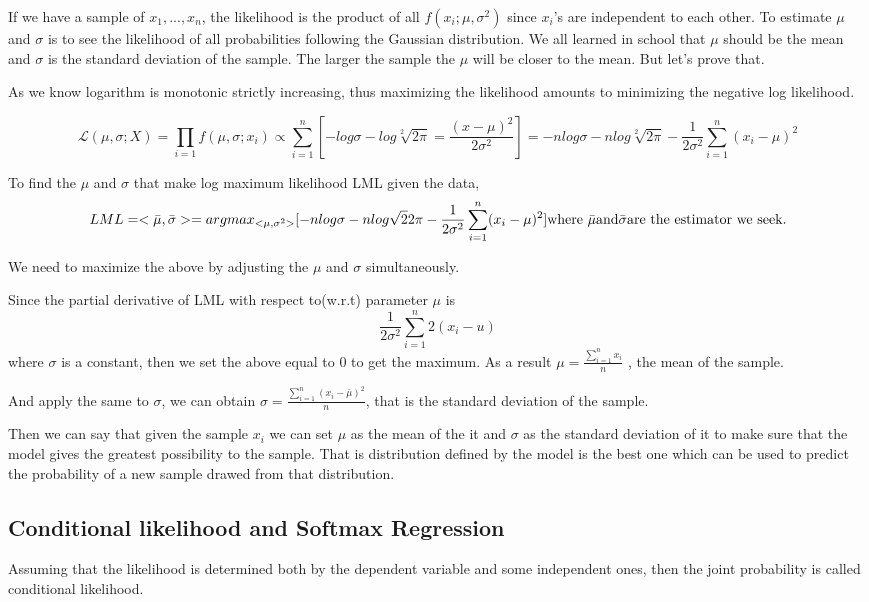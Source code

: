 \documentclass[a4paper]{article}
\begin{document}
If we have a sample of ${x_1,...,x_n}$, the likelihood is the product of all $f(x_i; \mu, \sigma^2)$ since $x_i$'s are independent to each other. To estimate $\mu$ and $\sigma$ is to see the likelihood of all probabilities following the Gaussian distribution. We all learned in school that $\mu$ should be the mean and $\sigma$ is the standard deviation of the sample. The larger the sample the $\mu$ will be closer to the mean. But let's prove that.     

As we know logarithm is monotonic strictly increasing, thus maximizing the likelihood amounts to minimizing the negative log likelihood.   

$$\mathcal{L}(\mu, \sigma; X) = \prod_{i=1}f(\mu, \sigma; x_i) \propto \sum_{i=1}^n [-log \sigma - log\sqrt[2]{2\pi} = \frac{(x-\mu)^2}{2\sigma^2}] = -n log \sigma - n log\sqrt[2]{2\pi} - \frac{1}{2\sigma^2}\sum_{i=1}^n(x_i - \mu)^2$$    

To find the $\mu$ and $\sigma$ that make log maximum likelihood LML given the data,
$$
LML = <\bar \mu, \bar \sigma> = argmax_{<\mu, \sigma^2>} [-n log \sigma - n log\sqrt{2}{2\pi} - \frac{1}{2\sigma^2}\sum_{i=1}^n(x_i - \mu)^2] \newline
\text{where\ } \bar \mu \text{and} \bar \sigma \text{are the estimator we seek.}
$$ 

We need to maximize the above by adjusting the $\mu$ and $\sigma$ simultaneously.     

Since the partial derivative of LML with respect to(w.r.t) parameter $\mu$ is    
$$\frac{1}{2\sigma^2}\sum_{i=1}^n2(x_i-u)$$
where $\sigma$ is a constant, then we set the above equal to 0 to get the maximum. As a result $\mu = \frac{\sum_{i=1}^n x_i}{n}$ , the mean of the sample.    

And apply the same to $\sigma$, we can obtain $\sigma = \frac{\sum_{i=1}^n(x_i - \bar \mu)^2}{n}$, that is the standard deviation of the sample.

Then we can say that given the sample $x_i$ we can set $\mu$ as the mean of the it and $\sigma$ as the standard deviation of it to make sure that the model gives the greatest possibility to the sample. That is distribution defined by the model is the best one which can be used to predict the probability of a new sample drawed from that distribution.    

\subsection{Conditional likelihood and Softmax Regression}
Assuming that the likelihood is determined both by the dependent variable and some independent ones, then the joint probability is called conditional likelihood. 
\end{document}
